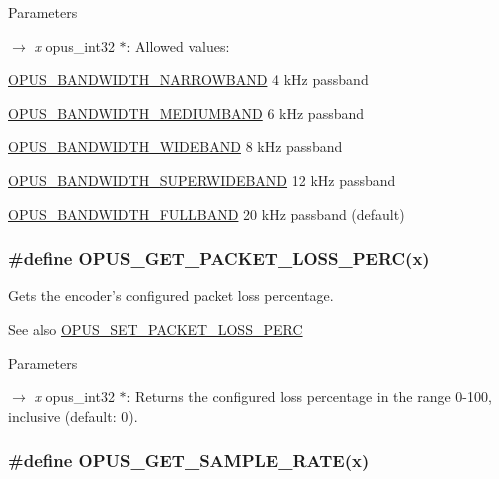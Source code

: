 \begin{DoxyParams}{Parameters}
\item[\mbox{$\rightarrow$} {\em x}]{\ttfamily opus\_\-int32 $\ast$}: Allowed values: 
\begin{DoxyDescription}
\item[\hyperlink{group__opus__ctlvalues_ga607dd310958b9c7d545d005e4572d47f}{OPUS\_\-BANDWIDTH\_\-NARROWBAND} ]4 kHz passband 
\item[\hyperlink{group__opus__ctlvalues_ga53a2aff4dc0ee23682927ca568c422a3}{OPUS\_\-BANDWIDTH\_\-MEDIUMBAND} ]6 kHz passband 
\item[\hyperlink{group__opus__ctlvalues_gac698e5d1281a3632251d2a4ead48afb9}{OPUS\_\-BANDWIDTH\_\-WIDEBAND} ]8 kHz passband 
\item[\hyperlink{group__opus__ctlvalues_ga41f86df35af0033a7361895da88671c1}{OPUS\_\-BANDWIDTH\_\-SUPERWIDEBAND}]12 kHz passband 
\item[\hyperlink{group__opus__ctlvalues_ga74cb052d8ec36cbcc9708c417558ebdd}{OPUS\_\-BANDWIDTH\_\-FULLBAND} ]20 kHz passband (default) 
\end{DoxyDescription}\end{DoxyParams}
\hypertarget{group__opus__encoderctls_gaa79261c6a55444993fca8d3a3a29d519}{
\subsubsection[{OPUS\_\-GET\_\-PACKET\_\-LOSS\_\-PERC}]{\setlength{\rightskip}{0pt plus 5cm}\#define OPUS\_\-GET\_\-PACKET\_\-LOSS\_\-PERC(x)}}
\label{group__opus__encoderctls_gaa79261c6a55444993fca8d3a3a29d519}


Gets the encoder's configured packet loss percentage. \begin{DoxySeeAlso}{See also}
\hyperlink{group__opus__encoderctls_gafda1c951dea919ba54432cd03827f1a9}{OPUS\_\-SET\_\-PACKET\_\-LOSS\_\-PERC} 
\end{DoxySeeAlso}

\begin{DoxyParams}{Parameters}
\item[\mbox{$\rightarrow$} {\em x}]{\ttfamily opus\_\-int32 $\ast$}: Returns the configured loss percentage in the range 0-\/100, inclusive (default: 0). \end{DoxyParams}
\hypertarget{group__opus__encoderctls_gac8ad425424211faae6a0fbfb7c28bb51}{
\subsubsection[{OPUS\_\-GET\_\-SAMPLE\_\-RATE}]{\setlength{\rightskip}{0pt plus 5cm}\#define OPUS\_\-GET\_\-SAMPLE\_\-RATE(x)}}
\label{group__opus__encoderctls_gac8ad425424211faae6a0fbfb7c28bb51}


